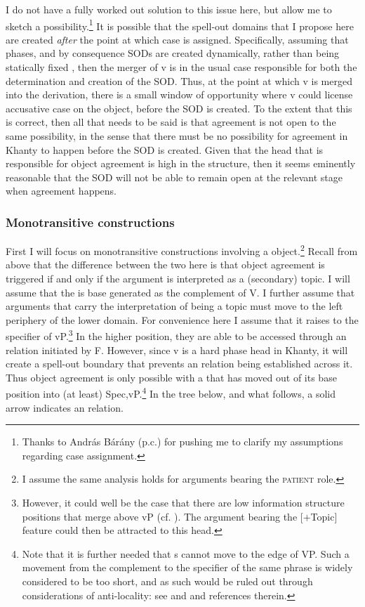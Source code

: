 \documentclass[output=paper
,modfonts
,nonflat]{langsci/langscibook}
\begin{document}
I do not have a fully worked out solution to this issue here, but allow me to sketch a possibility.\footnote{Thanks to András Bárány (p.c.) for pushing me to clarify my assumptions regarding case assignment.}
It is possible that the spell-out domains that I propose here are created \emph{after} the point at which case is assigned.
Specifically, assuming that phases, and by consequence SODs are created dynamically, rather than being statically fixed \citep[see for instance][]{bobaljikwurmbrand2005,bobaljikwurmbrand2013,boskovic2014}, then the merger of v is in the usual case responsible for both the determination and creation of the SOD.
Thus, at the point at which v is merged into the derivation, there is a small window of opportunity where v could license accusative case on the object, before the SOD is created.
To the extent that this is correct, then all that needs to be said is that agreement is not open to the same possibility, in the sense that there must be no possibility for agreement in Khanty to happen before the SOD is created.
Given that the head that is responsible for object agreement is high in the structure, then it seems eminently reasonable that the SOD will not be able to remain open at the relevant stage when agreement happens.

\subsubsection{Monotransitive constructions}

First I will focus on monotransitive constructions involving a \theme{} object.\footnote{I assume the same analysis holds for arguments bearing the \textsc{patient} role.}
Recall from above that the difference between the two here is that object agreement is triggered if and only if the \theme{} argument is interpreted as a (secondary) topic.
I will assume that the \theme{} is base generated as the complement of V.
I further assume that arguments that carry the interpretation of being a topic must move to the left periphery of the lower domain.
For convenience here I assume that it raises to the specifier of vP.\footnote{However, it could well be the case that there are low information structure positions that merge above vP (cf. \citealt{belletti2004,belletti2005a}). The argument bearing the [$+$Topic] feature could then be attracted to this head.}
In the higher position, they are able to be accessed through an \agree{} relation initiated by F.
However, since v is a hard phase head in Khanty, it will create a spell-out boundary that prevents an \agree{} relation being established across it.
Thus object agreement is only possible with a \theme{} that has moved out of its base position into (at least) Spec,vP.\footnote{Note that it is further needed that \theme s cannot move to the edge of VP. Such a movement from the complement to the specifier of the same phrase is widely considered to be too short, and as such would be ruled out through considerations of anti-locality: see \citet{abels2003} and \citet{grohmann2011} and references therein.}
In the tree below, and what follows, a solid arrow indicates an \agree{} relation.
\end{document}
